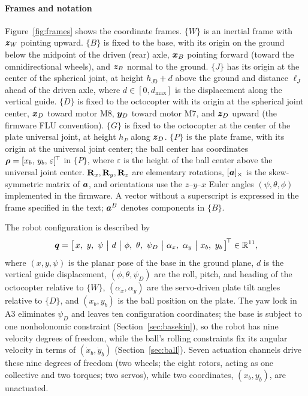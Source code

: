 \paragraph{Frames and notation}
Figure~\ref{fig:frames} shows the coordinate frames. $\{W\}$ is an inertial frame with $\bm{z}_W$ pointing upward. $\{B\}$ is fixed to the base, with its origin on the ground below the midpoint of the driven (rear) axle, $\bm{x}_B$ pointing forward (toward the omnidirectional wheels), and $\bm{z}_B$ normal to the ground. $\{J\}$ has its origin at the center of the spherical joint, at height $h_{J0}+d$ above the ground and distance $\ell_J$ ahead of the driven axle, where $d\in[0,d_{\max}]$ is the displacement along the vertical guide. $\{D\}$ is fixed to the octocopter with its origin at the spherical joint center, $\bm{x}_D$ toward motor M8, $\bm{y}_D$ toward motor M7, and $\bm{z}_D$ upward (the firmware FLU convention). $\{G\}$ is fixed to the octocopter at the center of the plate universal joint, at height $h_P$ along $\bm{z}_D$. $\{P\}$ is the plate frame, with its origin at the universal joint center; the ball center has coordinates $\bm{\rho}=[x_b,\,y_b,\,\varepsilon]^{\!\top}$ in $\{P\}$, where $\varepsilon$ is the height of the ball center above the universal joint center. $\mathbf{R}_x,\mathbf{R}_y,\mathbf{R}_z$ are elementary rotations, $[\bm{a}]_\times$ is the skew-symmetric matrix of $\bm{a}$, and orientations use the $z$--$y$--$x$ Euler angles $(\psi,\theta,\phi)$ implemented in the firmware. A vector without a superscript is expressed in the frame specified in the text; $\bm{a}^{B}$ denotes components in $\{B\}$.

The robot configuration is described by
\begin{equation}
  \vect{q}=\big[\,x,\ y,\ \psi\ \big|\ d\ \big|\ \phi,\ \theta,\ \psi_D\ \big|\ \alpha_x,\ \alpha_y\ \big|\ x_b,\ y_b\,\big]\T\in\mathbb{R}^{11},
  \label{eq:q}
\end{equation}
where $(x,y,\psi)$ is the planar pose of the base in the ground plane, $d$ is the vertical guide displacement, $(\phi,\theta,\psi_D)$ are the roll, pitch, and heading of the octocopter relative to $\{W\}$, $(\alpha_x,\alpha_y)$ are the servo-driven plate tilt angles relative to $\{D\}$, and $(x_b,y_b)$ is the ball position on the plate. The yaw lock in A3 eliminates $\psi_D$ and leaves ten configuration coordinates; the base is subject to one nonholonomic constraint (Section~\ref{sec:basekin}), so the robot has nine velocity degrees of freedom, while the ball's rolling constraints fix its angular velocity in terms of $(\dot x_b,\dot y_b)$ (Section~\ref{sec:ball}). Seven actuation channels drive these nine degrees of freedom (two wheels; the eight rotors, acting as one collective and two torques; two servos), while two coordinates, $(x_b,y_b)$, are unactuated.

